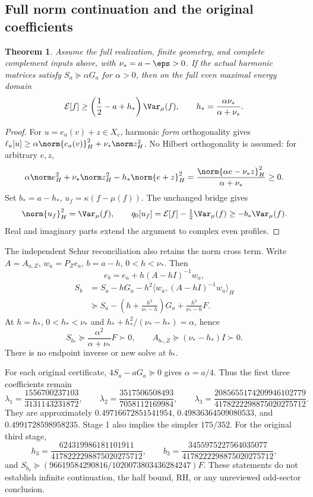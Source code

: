 \documentclass[11pt,a4paper]{article}
\numberwithin{equation}{section}
\newtheorem{theorem}{Theorem}[section]
\theoremstyle{definition}\newtheorem{definition}[theorem]{Definition}
\theoremstyle{remark}\newtheorem{remark}[theorem]{Remark}
\newcommand{\E}{\mathcal E}\newcommand{\D}{\mathcal D}
\begin{document}
\subsection{Full norm continuation and the original coefficients}\label{vrg:sec:continuation}
\begin{theorem}\label{vrg:thm:global}
Assume the full realization, finite geometry, and complete complement
inputs above, with \(\nu_*=a-\eps>0\).
If the actual harmonic matrices satisfy \(S_a\succeq\alpha G_a\) for
\(\alpha>0\), then on the full even maximal energy domain
\[
\E[f]\geq\left(\frac12-a+h_*\right)\Var_\mu(f),
\qquad h_*=\frac{\alpha\nu_*}{\alpha+\nu_*}.
\]
\end{theorem}
\begin{proof}
For \(u=e_a(v)+z\in X_c\), harmonic \emph{form} orthogonality gives
\(\ell_a[u]\geq\alpha\norm{e_a(v)}_H^2+\nu_*\norm z_H^2\).
No Hilbert orthogonality is assumed: for arbitrary \(e,z\),
\[
\alpha\norm e_H^2+\nu_*\norm z_H^2-h_*\norm{e+z}_H^2
 =\frac{\norm{\alpha e-\nu_*z}_H^2}{\alpha+\nu_*}\geq0.
\]
Set \(b_*=a-h_*\), \(u_f=\kappa(f-\mu(f))\). The unchanged bridge gives
\[
\norm{u_f}_H^2=\Var_\mu(f),\qquad
q_0[u_f]=\E[f]-\tfrac12\Var_\mu(f)\geq-b_*\Var_\mu(f).
\]
Real and imaginary parts extend the argument to complex even profiles.
\end{proof}

The independent Schur reconciliation also retains the norm cross term.
Write \(A=A_{a,Z}\), \(w_a=P_Ze_a\), \(b=a-h\), \(0<h<\nu_*\). Then
\[
e_b=e_a+h(A-hI)^{-1}w_a,
\]
\begin{align*}
S_b&=S_a-hG_a-h^2\langle w_a,(A-hI)^{-1}w_a\rangle_H\\
&\succeq S_a-\left(h+\frac{h^2}{\nu_*-h}\right)G_a
   +\frac{h^2}{\nu_*-h}F .
\end{align*}
At \(h=h_*\), \(0<h_*<\nu_*\) and
\(h_*+h_*^2/(\nu_*-h_*)=\alpha\), hence
\[
S_{b_*}\succeq\frac{\alpha^2}{\alpha+\nu_*}F\succ0,
\qquad A_{b_*,Z}\succeq(\nu_*-h_*)I\succ0.
\]
There is no endpoint inverse or new solve at \(b_*\).

For each original certificate, \(4S_a-aG_a\succeq0\) gives
\(\alpha=a/4\). Thus the first three coefficients remain
\[
\lambda_1=\frac{1556700237103}{3131143231872},\qquad
\lambda_2=\frac{3517506508493}{7058112169984},\qquad
\lambda_3=\frac{2085655174209946102779}{4178222298875020275712}.
\]
They are approximately \(0.49716672851541954\),
\(0.49836364509080533\), and \(0.4991728598958235\).
Stage 1 also implies the simpler \(175/352\).
For the original third stage,
\[
h_3=\frac{624319986181101911}{4178222298875020275712},\qquad
b_3=\frac{3455975227564035077}{4178222298875020275712},
\]
and \(S_{b_3}\succeq(96619584290816/1020073803436284247)F\).
These statements do not establish infinite continuation, the half bound,
RH, or any unreviewed odd-sector conclusion.
\end{document}
